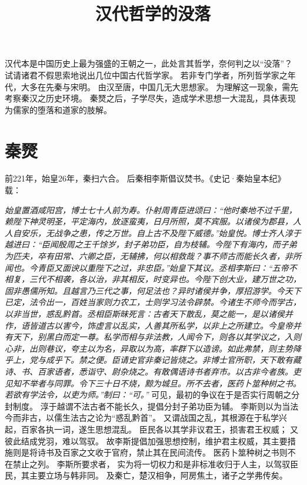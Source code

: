 \documentclass[11pt]{article}
\title{汉代哲学的没落}
\date{}
\begin{document}
  \maketitle

  \linenumbers
  
汉代本是中国历史上最为强盛的王朝之一，此处言其哲学，奈何判之以“没落”？
试请诸君不假思索地说出几位中国古代哲学家。
若非专门学者，所列哲学家之年代，大多在先秦与宋明。
由汉至唐，中国几无大思想家。
为理解这一现象，需先考察秦汉之历史环境。
秦燹之后，子学尽失，造成学术思想一大混乱，具体表现为儒家的堕落和道家的肢解。

\section{秦燹}
前221年，始皇26年，秦扫六合。
后秦相李斯倡议焚书。《史记·秦始皇本纪》载：

\textit{始皇置酒咸阳宫，博士七十人前为寿。仆射周青臣进颂曰：“他时秦地不过千里，赖陛下神灵明圣，平定海内，放逐蛮夷，日月所照，莫不宾服。以诸侯为郡县，人人自安乐，无战争之患，传之万世。自上古不及陛下威德。”始皇悦。博士齐人淳于越进曰：“臣闻殷周之王千馀岁，封子弟功臣，自为枝辅。今陛下有海内，而子弟为匹夫，卒有田常、六卿之臣，无辅拂，何以相救哉？事不师古而能长久者，非所闻也。今青臣又面谀以重陛下之过，非忠臣。”始皇下其议。丞相李斯曰：“五帝不相复，三代不相袭，各以治，非其相反，时变异也。今陛下创大业，建万世之功，固非愚儒所知。且越言乃三代之事，何足法也？异时诸侯并争，厚招游学。今天下已定，法令出一，百姓当家则力农工，士则学习法令辟禁。今诸生不师今而学古，以非当世，惑乱黔首。丞相臣斯昧死言：古者天下散乱，莫之能一，是以诸侯并作，语皆道古以害今，饰虚言以乱实，人善其所私学，以非上之所建立。今皇帝并有天下，别黑白而定一尊。私学而相与非法教，人闻令下，则各以其学议之，入则心非，出则巷议，夸主以为名，异取以为高，率群下以造谤。如此弗禁，则主势降乎上，党与成乎下。禁之便。臣请史官非秦记皆烧之。非博士官所职，天下敢有藏诗、书、百家语者，悉诣守、尉杂烧之。有敢偶语诗书者弃市。以古非今者族。吏见知不举者与同罪。令下三十日不烧，黥为城旦。所不去者，医药卜筮种树之书。若欲有学法令，以吏为师。”制曰：“可。”}
可见，最初的争议在于是否实行周朝之分封制度。
淳于越谓不法古者不能长久，提倡分封子弟功臣为辅。
李斯则以为当法今而非古，以儒生法古之论为“惑乱黔首”。
又谓战国之乱，其根源在于私学兴起，百家各执一词，遂生思想混乱。
臣民各以其学非议君王，损害君王权威；
又彼此结成党羽，难以驾驭。
故李斯提倡加强思想控制，维护君主权威，其主要措施则是将诗书及百家之文收于官府，禁止其在民间流传。
医药卜筮种树之书则不在禁止之列。
李斯所要求者， 实为将一切权力和是非标准收归于人主，以驾驭臣民，其主要立场与韩非同。
及秦亡，楚汉相争，阿房焦土，诸子之学弗传矣。
\end{document}
